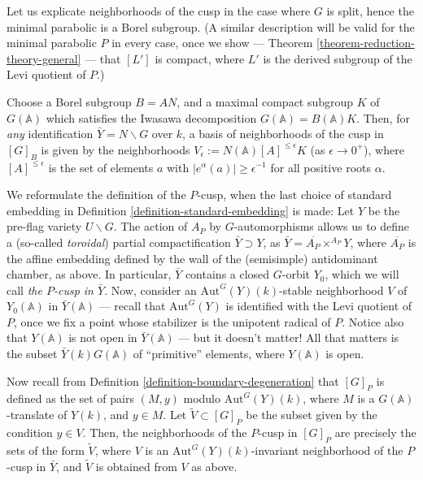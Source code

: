 \begin{remark}
 \label{remark-cusp-Iwasawa}
Let us explicate neighborhoods of the cusp in the case where $G$ is split, hence the minimal parabolic is a Borel subgroup. (A similar description will be valid for the minimal parabolic $P$ in every case, once we show --- Theorem \ref{theorem-reduction-theory-general} --- that $[L']$ is compact, where $L'$ is the derived subgroup of the Levi quotient of $P$.) 

Choose a Borel subgroup $B=AN$, and a maximal compact subgroup $K$ of $G(\mathbb A)$ which satisfies the Iwasawa decomposition $G(\mathbb A) = B(\mathbb A)K$. 
 Then, for \emph{any} identification $\bar Y = N\backslash G$ over $k$, a basis of neighborhoods of the cusp in $[G]_B$ is given by the neighborhoods $V_\epsilon := N(\mathbb A)[A]^{\le \epsilon}  K$ (as $\epsilon\to 0^+$), where $[A]^{\le \epsilon}$ is the set of elements $a$ with $|e^\alpha(a)|\ge \epsilon^{-1}$ for all positive roots $\alpha$. 
\end{remark} 

We reformulate the definition of the $P$-cusp, when the last choice of standard embedding in Definition \ref{definition-standard-embedding} is made: Let $Y$ be the pre-flag variety $U\backslash G$. The action of $A_P$ by $G$-automorphisms allows us to define a (so-called \emph{toroidal}) partial compactification $\bar Y\supset Y$, as $\bar Y = \overline{A_P} \times^{A_P} Y$, where $\overline{A_P}$ is the affine embedding defined by the wall of the (semisimple) antidominant chamber, as above. In particular, $\bar Y$ contains a closed $G$-orbit $Y_0$, which we will call \emph{the $P$-cusp in $\bar Y$}. Now, consider an $\text{Aut}^G(Y)(k)$-stable neighborhood $V$ of $Y_0(\mathbb A)$ in $\bar Y(\mathbb A)$ --- recall that $\text{Aut}^G(Y)$ is identified with the Levi quotient of $P$, once we fix a point whose stabilizer is the unipotent radical of $P$. Notice also that $Y(\mathbb A)$ is not open in $\bar Y(\mathbb A)$ --- but it doesn't matter! All that matters is the subset $\bar Y(k)G(\mathbb A)$ of ``primitive'' elements, where $Y(\mathbb A)$ is open.

Now recall from Definition \ref{definition-boundary-degeneration} that $[G]_P$ is defined as the set of pairs $(M,y)$ modulo $\text{Aut}^G(Y)(k)$, where $M$ is a $G(\mathbb A)$-translate of $Y(k)$, and $y\in M$. Let $\tilde V\subset [G]_P$ be the subset given by the condition $y\in V$. Then, the neighborhoods of the $P$-cusp in $[G]_P$ are precisely the sets of the form $\tilde V$, where $V$ is an $\text{Aut}^G(Y)(k)$-invariant neighborhood of the $P$-cusp in $\bar Y$, and $\tilde V$ is obtained from $V$ as above.



